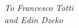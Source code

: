 \newpage\null\thispagestyle{empty}\newpage
\thispagestyle{empty}
\begin{flushright}
\null{}
{\em To Francesco Totti} \\
{\em and Edin Dzeko}
\null
\end{flushright}